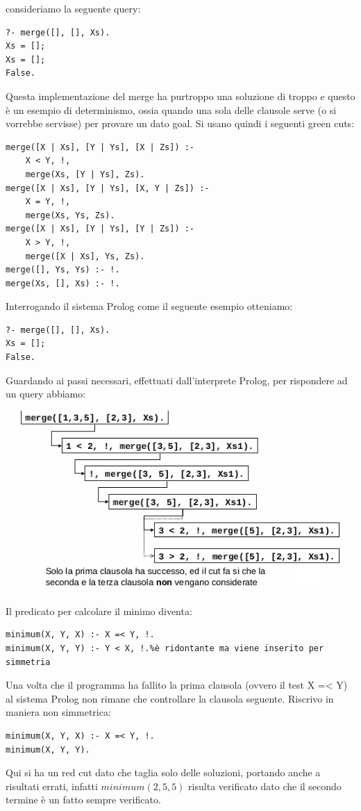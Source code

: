 consideriamo la seguente query:
\begin{verbatim}
?- merge([], [], Xs).
Xs = [];
Xs = [];
False.
\end{verbatim}
Questa implementazione del merge ha purtroppo una soluzione di troppo e questo è un esempio di determinismo, ossia
quando una sola delle clausole serve (o si vorrebbe servisse) per provare un dato goal.\newline
Si usano quindi i seguenti green cuts:
\begin{verbatim}
merge([X | Xs], [Y | Ys], [X | Zs]) :-
	X < Y, !,
	merge(Xs, [Y | Ys], Zs).
merge([X | Xs], [Y | Ys], [X, Y | Zs]) :-
	X = Y, !,
	merge(Xs, Ys, Zs).
merge([X | Xs], [Y | Ys], [Y | Zs]) :-
	X > Y, !,
	merge([X | Xs], Ys, Zs).
merge([], Ys, Ys) :- !.
merge(Xs, [], Xs) :- !.
\end{verbatim}
Interrogando il sistema Prolog come il seguente esempio otteniamo:
\begin{verbatim}
?- merge([], [], Xs).
Xs = [];
False.
\end{verbatim}
Guardando ai passi necessari, effettuati dall'interprete Prolog, per rispondere ad un query abbiamo:
\begin{center}
\includegraphics[scale=0.8]{img/cut3.png}
\end{center}
Il predicato per calcolare il minimo diventa:
\begin{verbatim}
minimum(X, Y, X) :- X =< Y, !.
minimum(X, Y, Y) :- Y < X, !.%è ridontante ma viene inserito per simmetria
\end{verbatim}
Una volta che il programma ha fallito la prima clausola (ovvero il test X =< Y) al sistema Prolog non rimane che controllare la
clausola seguente.\newline
Riscrivo in maniera non simmetrica:
\begin{verbatim}
minimum(X, Y, X) :- X =< Y, !.
minimum(X, Y, Y).
\end{verbatim}
Qui si ha un red cut dato che taglia solo delle soluzioni, portando anche a risultati errati, infatti $minimum(2, 5, 5)$ risulta verificato
dato che il secondo termine è un fatto sempre verificato.

